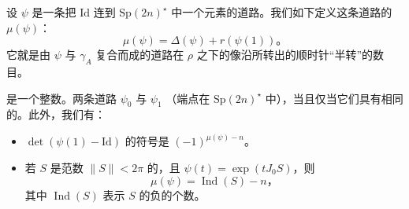 设 $\psi$ 是一条把 $\mathrm{Id}$ 连到 $\mathrm{Sp}(2n)^\star$ 中一个元素的道路。我们如下定义这条道路的\trMaslovIndex{} $\mu(\psi)$：
\[
\mu(\psi)=\Delta(\psi)+r(\psi(1))\text{。}
\]
它就是由 $\psi$ 与 $\gamma_A$ 复合而成的道路在 $\rho$ 之下的像沿\trCircle{}所转出的顺时针“半转”的数目。

\begin{proposition}\label{thm:maslov-index-integer}
\trMaslovIndex{}是一个整数。两条道路 $\psi_0$ 与 $\psi_1$ \trHomotopic{}（端点在 $\mathrm{Sp}(2n)^\star$ 中），当且仅当它们具有相同的\trIndex。此外，我们有：
\begin{itemize}
\item $\det(\psi(1)-\mathrm{Id})$ 的符号是 $(-1)^{\mu(\psi)-n}$。
\item 若 $S$ 是范数 $\|S\|<2\pi$ 的\trInvertible\trSymmetricMatrix，且 $\psi(t)=\exp(tJ_0S)$，则
\[
\mu(\psi)=\operatorname{Ind}(S)-n\text{，}
\]
其中 $\operatorname{Ind}(S)$ 表示 $S$ 的负\trEigenvalue{}的个数。
\end{itemize}
\end{proposition}

